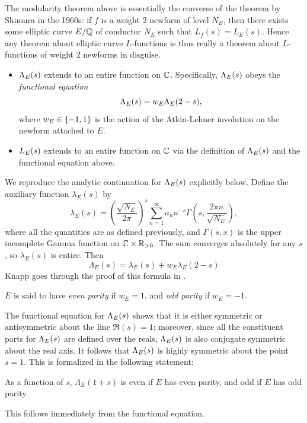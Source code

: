 The modularity theorem above is essentially the converse of the theorem by Shimura in the 1960s: if $f$ is a weight $2$ newform of level $N_E$, then there exists some elliptic curve $E/\mathbb{Q}$ of conductor $N_E$ such that $L_f(s) = L_E(s)$. Hence any theorem about elliptic curve $L$-functions is thus really a theorem about $L$-functions of weight 2 newforms in disguise. \\

\begin{corollary} \mbox{}
\begin{itemize}
\item $\Lambda_E(s)$ extends to an entire function on $\mathbb{C}$. Specifically, $\Lambda_E(s)$ obeys the {\it functional equation}
\begin{equation}
\Lambda_E(s) = w_E \Lambda_E(2-s),
\end{equation}
where $w_E \in \left\{-1, 1\right\}$ is the action of the Atkin-Lehner involution on the newform attached to $E$.
\item $L_E(s)$ extends to an entire function on $\mathbb{C}$ via the definition of $\Lambda_E(s)$ and the functional equation above.
\end{itemize}
\end{corollary}

We reproduce the analytic continuation for $\Lambda_E(s)$ explicitly below. Define the auxiliary function $\lambda_E(s)$ by
\begin{equation}\label{eqn:Lams_analytic_continuation}
\lambda_E(s) = \left(\frac{\sqrt{N_E}}{2\pi}\right)^{s} \sum_{n=1}^\infty a_n n^{-s}\Gamma \left(s,\frac{2\pi n}{\sqrt{N_E}}\right),
\end{equation}
where all the quantities are as defined previously, and $\Gamma(s,x)$ is the upper incomplete Gamma function on $\mathbb{C}\times \mathbb{R}_{>0}$. The sum converges absolutely for any $s$, so $\lambda_E(s)$ is entire. Then
\begin{equation}
\Lambda_E(s) = \lambda_E(s) + w_E \lambda_E(2-s)
\end{equation}
Knapp goes through the proof of this formula in \cite[pp. 270-271]{Kna-1992}. \\

\begin{definition}
$E$ is said to have {\it even parity} if $w_E = 1$, and {\it odd parity} if $w_E = -1$.
\end{definition}

The functional equation for $\Lambda_E(s)$ shows that it is either symmetric or antisymmetric about the line $\Re(s) = 1$; moreover, since all the constituent parts for $\Lambda_E(s)$ are defined over the reals, $\Lambda_E(s)$ is also conjugate symmetric about the real axis. It follows that $\Lambda_E(s)$ is highly symmetric about the point $s=1$. This is formalized in the following statement:
\begin{proposition}
As a function of $s$, $\Lambda_E(1+s)$ is even if $E$ has even parity, and odd if $E$ has odd parity.
\end{proposition}
This follows immediately from the functional equation. \\

